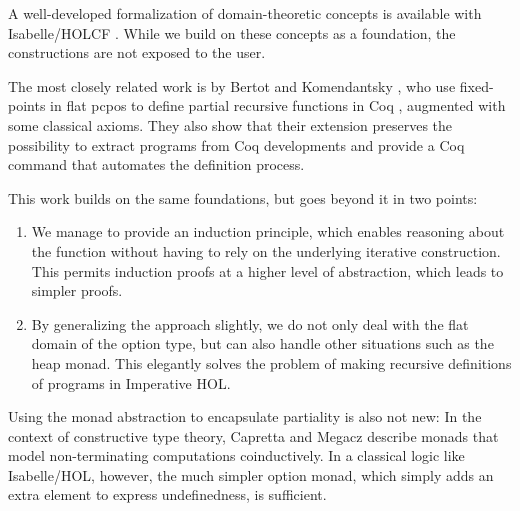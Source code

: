 \documentclass[copyright,creativecommons,sharealike]{eptcs}
\theoremstyle{remark}
\begin{document}
\begin{isabellebody}
\begin{isamarkuptext}
  A well-developed formalization of domain-theoretic concepts is
  available with Isabelle/HOLCF \cite{holcf}. While we
  build on these concepts as a foundation, the constructions are not
  exposed to the user.\end{isamarkuptext}\isamarkuptrue {}
\isamarkuptrue \begin{isamarkuptext}The most closely related work is by Bertot and Komendantsky
\cite{Bertot2008}, who use fixed-points in flat pcpos to define
partial recursive functions in Coq \cite{coqart}, augmented with some
classical axioms. They also show that their extension preserves the
possibility to extract programs from Coq developments and provide a
Coq command that automates the definition process.

This work builds on the same foundations, but goes beyond it in
two points:
\begin{enumerate}
\item We manage to provide an induction principle, which enables
reasoning about the function without having to rely on the underlying
iterative construction.  This permits induction proofs at a higher
level of abstraction, which leads to simpler proofs.

\item By generalizing the approach slightly, we do not only deal with
  the flat domain of the option type, but can also handle
  other situations such as the heap monad. This elegantly
  solves the problem of making recursive definitions of programs in
  Imperative HOL.
\end{enumerate}

Using the monad abstraction to encapsulate partiality is also not new:
In the context of constructive type theory, Capretta
\cite{Capretta2005} and Megacz \cite{Megacz2007} describe monads that
model non-terminating computations coinductively.  In a classical
logic like Isabelle/HOL, however, the much simpler option monad, which
simply adds an extra element to express undefinedness, is sufficient.




\end{isamarkuptext}
\end{isabellebody}
\end{document}
